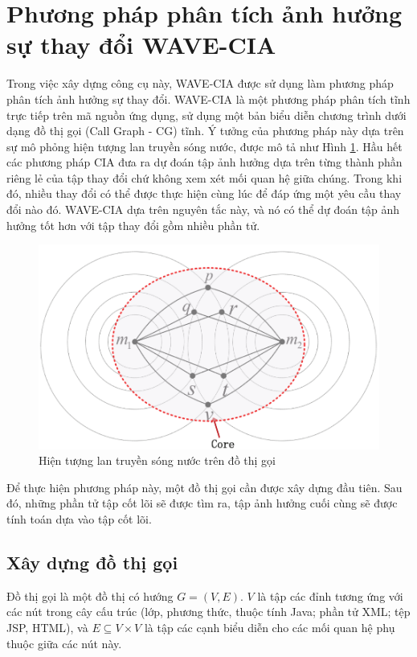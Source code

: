 \documentclass[12pt]{report}
\begin{document}
\section{Phương pháp phân tích ảnh hưởng sự thay đổi WAVE-CIA\cite{cia-wave}}
Trong việc xây dựng công cụ này, WAVE-CIA được sử dụng làm phương pháp phân tích ảnh hưởng sự thay đổi. WAVE-CIA là một phương pháp phân tích tĩnh trực tiếp trên mã nguồn ứng dụng, sử dụng một bản biểu diễn chương trình dưới dạng đồ thị gọi (Call Graph - CG) tĩnh. Ý tưởng của phương pháp này dựa trên sự mô phỏng hiện tượng lan truyền sóng nước, được mô tả như Hình \ref{wave-cia-phenomenon}. Hầu hết các phương pháp CIA đưa ra dự đoán tập ảnh hưởng dựa trên từng thành phần riêng lẻ của tập thay đổi chứ không xem xét mối quan hệ giữa chúng. Trong khi đó, nhiều thay đổi có thể được thực hiện cùng lúc để đáp ứng một yêu cầu thay đổi nào đó. WAVE-CIA dựa trên nguyên tắc này, và nó có thể dự đoán tập ảnh hưởng tốt hơn với tập thay đổi gồm nhiều phần tử.

\begin{figure}[h]
	\centering
	\includegraphics[scale=0.45]{wave-cia-phenomenon}
	\caption{Hiện tượng lan truyền sóng nước trên đồ thị gọi}
	\label{wave-cia-phenomenon}	
\end{figure}

Để thực hiện phương pháp này, một đồ thị gọi cần được xây dựng đầu tiên. Sau đó, những phần tử tập cốt lõi sẽ được tìm ra, tập ảnh hưởng cuối cùng sẽ được tính toán dựa vào tập cốt lõi.

\subsection{Xây dựng đồ thị gọi}
Đồ thị gọi là một đồ thị có hướng $G = (V, E)$. $V$ là tập các đỉnh tương ứng với các nút trong cây cấu trúc (lớp, phương thức, thuộc tính Java; phần tử XML; tệp JSP, HTML), và $E \subseteq V \times V$ là tập các cạnh biểu diễn cho các mối quan hệ phụ thuộc giữa các nút này.
\end{document}
